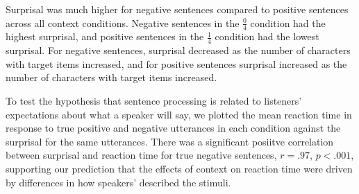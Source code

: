 \documentclass[man, noapacite]{apa2}
\begin{document}
Surprisal was much higher for negative sentences compared to positive sentences across all context conditions.  Negative sentences in the $\frac{0}{4}$ condition had the highest surprisal, and positive sentences in the $\frac{1}{4}$ condition had the lowest surprisal.  For negative sentences, surprisal decreased as the number of characters with target items increased, and for positive sentences surprisal increased as the number of characters with target items increased.  

To test the hypothesis that sentence processing is related to listeners' expectations about what a speaker will say, we plotted the mean reaction time in response to true positive and negative utterances in each condition against the surprisal for the same utterances.  There was a significant posiitve correlation between surprisal and reaction time for true negative sentences, $r=.97$, $p<.001$, supporting our prediction that the effects of context on reaction time were driven by differences in how speakers' described the stimuli.  





\end{document}
